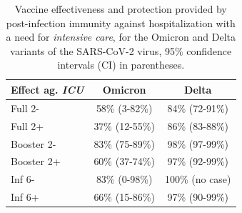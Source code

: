 \documentclass[9pt,twocolumn,twoside,lineno]{pnas-new}
\begin{document}

\begin{table}[!ht]
\caption{Vaccine effectiveness and protection provided by post-infection immunity against hospitalization with a need for {\it intensive care}, for the Omicron and Delta variants of the SARS-CoV-2 virus, 95\% confidence intervals (CI) in parentheses.}
\label{tabUalone}
\centering
\begin{tabular}{|l|c|c|}
\hline
\cellcolor{gray!20}Effect ag. {\it ICU}&\cellcolor{gray!20}Omicron&\cellcolor{gray!20}Delta\\
\hline
Full 2-&58\% (3-82\%)&84\% (72-91\%)\\
\cellcolor{gray!10}Full 2+&\cellcolor{gray!10}37\% (12-55\%)&\cellcolor{gray!10}86\% (83-88\%)\\
Booster 2-&83\% (75-89\%)&98\% (97-99\%)\\
\cellcolor{gray!10}Booster 2+&\cellcolor{gray!10}60\% (37-74\%)&\cellcolor{gray!10}97\% (92-99\%)\\
Inf 6-&83\% (0-98\%)&100\% (no case)\\
\cellcolor{gray!10}Inf 6+&\cellcolor{gray!10}66\% (15-86\%)&\cellcolor{gray!10}97\% (90-99\%)\\
\hline
\end{tabular}
\end{table}
\end{document}
